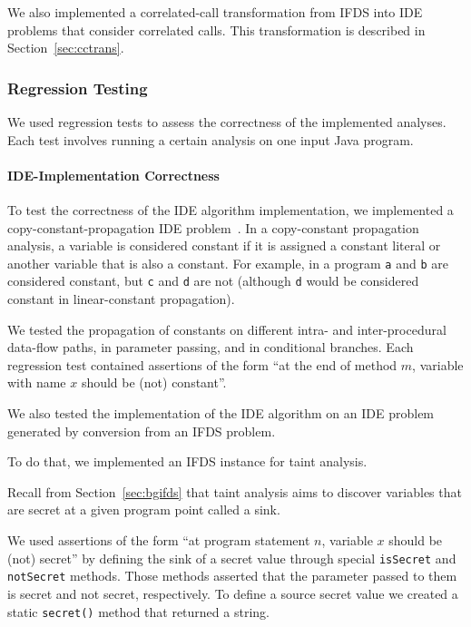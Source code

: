 We also implemented a correlated-call transformation from IFDS into IDE problems that consider correlated calls. This transformation is described in Section~\ref{sec:cctrans}.

\subsubsection{Regression Testing}
We used regression tests to assess the correctness of the implemented analyses. Each test involves running a certain analysis on one input Java program.

\begin{mdelete}
\paragraph{IDE-Implementation Correctness}
To test the correctness of the IDE algorithm implementation, we implemented a copy-constant-propagation IDE problem~\cite{sagiv1996precise}.
In a copy-constant propagation analysis, a variable is considered constant if it is assigned a constant literal or another variable that is also a constant. For example, in a program
\texttt a and \texttt b are considered constant, but \texttt c and \texttt d are not (although \texttt d would be considered constant in linear-constant propagation).

We tested the propagation of constants on different intra- and inter-procedural data-flow paths, in parameter passing,
and in conditional branches. Each regression test contained assertions of the form ``at the end of method $m$, variable with name $x$ should be (not) constant''.

We also tested the implementation of the IDE algorithm on an IDE problem generated by conversion from an IFDS problem.

To do that, we implemented an IFDS instance for taint analysis.

Recall from Section~\ref{sec:bgifds} that taint analysis aims to discover variables that are secret at a given program point called a sink.

We used assertions of the form ``at program statement $n$, variable $x$ should be (not) secret'' by defining the sink of a secret value through special \verb'isSecret' and \verb'notSecret' methods.
Those methods asserted that the parameter passed to them is secret and not secret, respectively.
To define a source secret value we created a static \verb'secret()' method that returned a string. 


\end{mdelete}
